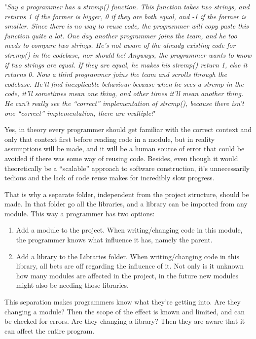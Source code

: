\documentclass{article}
\begin{document}
"\emph{Say a programmer has a strcmp() function. This function takes two strings, and returns 1 if the former is bigger, 0 if they are both equal, and -1 if the former is smaller. Since there is no way to reuse code, the programmer will copy paste this function quite a lot. One day another programmer joins the team, and he too needs to compare two strings. He’s not aware of the already existing code for strcmp() in the codebase, nor should he! Anyways, the programmer wants to know if two strings are equal. If they are equal, he makes his strcmp() return 1, else it returns 0. Now a third programmer joins the team and scrolls through the codebase. He’ll find inexplicable behaviour because when he sees a strcmp in the code, it’ll sometimes mean one thing, and other times it’ll mean another thing. He can’t really see the “correct” implementation of strcmp(), because there isn’t one “correct” implementation, there are multiple!}"


Yes, in theory every programmer should get familiar with the correct context and only that context first before reading code in a module, but in reality assumptions will be made, and it will be a human source of error that could be avoided if there was some way of reusing code. Besides, even though it would theoretically be a “scalable” approach to software construction, it’s unnecessarily tedious and the lack of code reuse makes for incredibly slow progress.


That is why a separate folder, independent from the project structure, should be made. In that folder go all the libraries, and a library can be imported from any module. This way a programmer has two options:

\begin{enumerate}
    \item Add a module to the project. When writing/changing code in this module, the programmer knows what influence it has, namely the parent.
    \item Add a library to the Libraries folder. When writing/changing code in this library, all bets are off regarding the influence of it. Not only is it unknown how many modules are affected in the project, in the future new modules might also be needing those libraries.

\end{enumerate}


This separation makes programmers know what they’re getting into. Are they changing a module? Then the scope of the effect is known and limited, and can be checked for errors. Are they changing a library? Then they are aware that it can affect the entire program.
\end{document}

